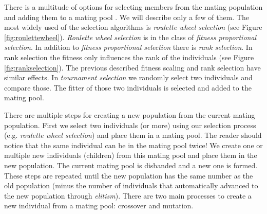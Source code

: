 There is a multitude of options for selecting members from the mating population and adding them to a mating pool \citep[for an overview see]{Goldberg91acomparative}. We will describe only a few of them. The most widely used of the selection algorithms is \textit{roulette wheel selection} (see Figure \ref{fig:roulettewheel}). \textit{Roulette wheel selection} is in the class of \textit{fitness proportional selection}. In addition to \textit{fitness proportional selection} there is \textit{rank selection}. In rank selection the fitness only influences the rank of the individuals (see Figure \ref{fig:rankselection}). The previous described fitness scaling and rank selection have similar effects. In \textit{tournament selection} we randomly select two individuals and compare those. The fitter of those two individuals is selected and added to the mating pool. 

There are multiple steps for creating a new population from the current mating population. First we select two individuals (or more) using our selection process (e.g. \textit{roulette wheel selection}) and place them in a mating pool. The reader should notice that the same individual can be in the mating pool twice! We create one or multiple new individuals (children) from this mating pool and place them in the new population. The current mating pool is disbanded and a new one is formed. These steps are repeated until the new population has the same number as the old population (minus the number of individuals that automatically advanced to the new population through \textit{elitism}). 
There are two main processes to create a new individual from a mating pool: crossover and mutation.

